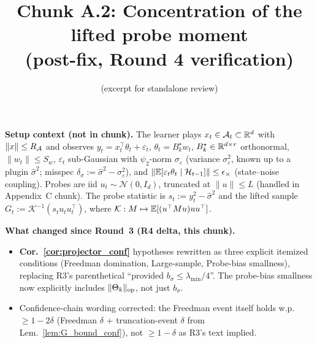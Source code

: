 

\title{Chunk A.2: Concentration of the lifted probe moment\\(post-fix, Round 4 verification)}
\author{(excerpt for standalone review)}
\date{}


\maketitle

\textbf{Setup context (not in chunk).} The learner plays $x_t \in \mathcal{A}_t
\subset \mathbb{R}^d$ with $\|x\| \le R_{\mathcal{A}}$ and observes
$y_t = x_t^\top\theta_t + \varepsilon_t$, $\theta_t = B_k^\star w_t$,
$B_k^\star \in \mathbb{R}^{d\times r}$ orthonormal, $\|w_t\|\le S_w$,
$\varepsilon_t$ sub-Gaussian with $\psi_2$-norm $\sigma_\varepsilon$
(variance $\sigma_\varepsilon^2$, known up to a plugin $\hat\sigma^2$;
misspec $\delta_\sigma := \hat\sigma^2-\sigma_\varepsilon^2$), and
$\|\mathbb{E}[\varepsilon_t\theta_t\mid\mathcal{H}_{t-1}]\|\le\epsilon_\times$
(state--noise coupling). Probes are iid $u_t\sim\mathcal N(0,I_d)$,
truncated at $\|u\|\le L$ (handled in Appendix~C chunk). The probe
statistic is $s_t := y_t^2 - \hat\sigma^2$ and the lifted sample
$G_t := \mathcal K^{-1}(s_t u_tu_t^\top)$, where $\mathcal K:M\mapsto\mathbb{E}[(u^\top M u)uu^\top]$.

\textbf{What changed since Round~3 (R4 delta, this chunk).}
\begin{itemize}[leftmargin=*,itemsep=1pt,topsep=1pt]
\item \textbf{Cor.~\ref{cor:projector_conf}} hypotheses rewritten as three
  explicit itemized conditions (Freedman domination, Large-sample,
  Probe-bias smallness), replacing R3's parenthetical ``provided
  $b_\sigma\le\lambda_{\min}/4$''. The probe-bias smallness now
  explicitly includes $\|\Theta_k\|_{\mathrm{op}}$, not just $b_\sigma$.
\item Confidence-chain wording corrected: the Freedman event itself
  holds w.p.\ $\ge 1-2\delta$ (Freedman $\delta$ + truncation-event $\delta$
  from Lem.~\ref{lem:G_bound_conf}), not $\ge 1-\delta$ as R3's text implied.
\end{itemize}

